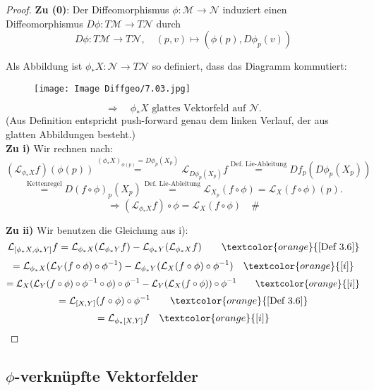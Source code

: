 \documentclass[fleqn, 12pt, letterpaper]{article}
\newcommand{\txt}[1]{\text{#1}}
\begin{document}
\vspace{0.5cm}
\begin{proof}
    \textbf{Zu (0)}: Der Diffeomorphismus \(\phi: \mathcal{M} \to \mathcal{N}\) induziert einen Diffeomorphismus \(D\phi: T\mathcal{M} \to T\mathcal{N}\) durch
\[
D\phi: T\mathcal{M} \to T\mathcal{N}, \quad (p, v) \mapsto (\phi(p), D\phi_p(v))
\]

Als Abbildung ist \(\phi_* X: \mathcal{N} \to T\mathcal{N}\) so definiert, dass das Diagramm kommutiert:
 \begin{figure}[H]
    \centering
    \texttt{[image: Image Diffgeo/7.03.jpg]}
 \end{figure}
\[
 \Rightarrow \quad \phi_* X \text{ glattes Vektorfeld auf } \mathcal{N}.
\]
(Aus Definition entspricht push-forward genau dem linken Verlauf, der aus glatten Abbildungen besteht.)\\

\textbf{Zu i)} Wir rechnen nach:
\[
(\mathcal{L}_{\phi_* X} f)(\phi(p)) \overset{(\phi_* X)_{\phi(p)} = D\phi_p(X_p)}{=} \mathcal{L}_{D\phi_p(X_p)} f\overset{\txt{Def. Lie-Ableitung}}{=} Df_p(D\phi_p(X_p))
\]
\[\overset{\txt{Kettenregel}}{=} D(f \circ \phi )_p(X_p)\overset{\txt{Def. Lie-Ableitung}}{=}\mathcal{L}_{X_p}(f \circ \phi) = \mathcal{L}_{X}(f \circ \phi)(p).\]
\[
\Rightarrow (\mathcal{L}_{\phi_* X} f) \circ \phi = \mathcal{L}_X(f \circ \phi)
\quad \# 
\]

\textbf{Zu ii)} Wir benutzen die Gleichung aus i):
\[
\mathcal{L}_{[\phi_* X, \phi_* Y]} f 
= \mathcal{L}_{\phi_* X} (\mathcal{L}_{\phi_* Y} f)
- \mathcal{L}_{\phi_* Y} (\mathcal{L}_{\phi_* X} f)
\qquad \textcolor{orange}{[\text{Def 3.6}]}
\]
\[
= \mathcal{L}_{\phi_* X} (\mathcal{L}_Y (f \circ \phi) \circ \phi^{-1})
- \mathcal{L}_{\phi_* Y} (\mathcal{L}_X (f \circ \phi) \circ \phi^{-1}) \quad \textcolor{orange}{[i]}
\]
\[
= \mathcal{L}_X (\mathcal{L}_Y(f \circ \phi) \circ \phi^{-1} \circ \phi) \circ \phi^{-1}
- \mathcal{L}_Y (\mathcal{L}_X(f \circ \phi)) \circ \phi^{-1}
\qquad \textcolor{orange}{[i]}
\]
\[
= \mathcal{L}_{[X,Y]}(f \circ \phi) \circ \phi^{-1}
\qquad \textcolor{orange}{[\text{Def 3.6}]}
\]
\[
= \mathcal{L}_{\phi_*[X,Y]} f \quad \textcolor{orange}{[i]}
\]


\end{proof}

\subsection{\(\phi\)-verknüpfte Vektorfelder}
\end{document}
